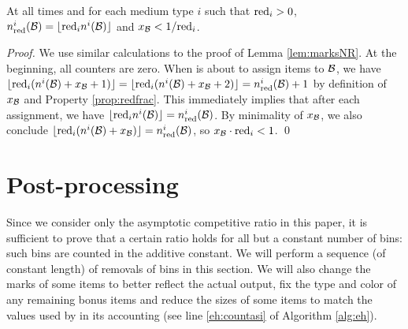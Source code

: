 \begin{lemma}
\label{lem:markB}
At all times and for each medium type $i$ such that $\mathrm{red}_i>0$, $n_{\mathrm{red}}^i(\mathcal{B}) = \lfloor \mathrm{red}_in^i(\mathcal{B})\rfloor$
and $x_{\mathcal{B}} < 1/\mathrm{red}_i$. 
\end{lemma}
\begin{proof}
We use similar calculations to the proof of Lemma \ref{lem:marksNR}.
At the beginning, all counters are zero. When {\MarkItems} is about to assign items to $\mathcal{B}$, 
we have $\lfloor \mathrm{red}_i(n^i(\mathcal{B}) + x_{\mathcal{B}} +1)\rfloor = \lfloor \mathrm{red}_i(n^i(\mathcal{B}) + x_{\mathcal{B}} +2)\rfloor =n_{\mathrm{red}}^i(\mathcal{B})+1$
by definition of $x_{\mathcal{B}}$ and Property \ref{prop:redfrac}.
This immediately implies that after each assignment,
we have $\lfloor \mathrm{red}_in^i(\mathcal{B}) \rfloor = n_{\mathrm{red}}^i(\mathcal{B})$. 
By minimality of $x_{\mathcal{B}}$, we also conclude $\lfloor \mathrm{red}_i(n^i(\mathcal{B}) + x_{\mathcal{B}} )\rfloor = n_{\mathrm{red}}^i(\mathcal{B})$, so  $x_{\mathcal{B}} \cdot \mathrm{red}_i < 1$.
\qed\end{proof}





















\section{Post-processing}
\label{sec:post}
Since we consider only the asymptotic competitive ratio in this paper, 
it is sufficient to prove that a certain ratio holds for 
all but a constant number of bins: such bins are counted in the additive constant.
We will perform a sequence (of constant length) of removals of bins in this section.
We will also change the marks of some items to better reflect the actual output, 
fix the type and color of any remaining bonus items and reduce the sizes of some items
to match the values used by {\EHarm} in its accounting (see line \ref{eh:countasi} of Algorithm \ref{alg:eh}).






